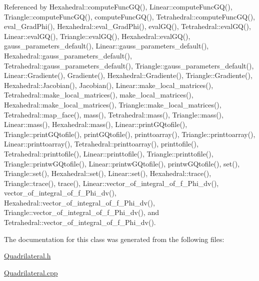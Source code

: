 Referenced by Hexahedral\+::compute\+Func\+G\+Q(), Linear\+::compute\+Func\+G\+Q(), Triangle\+::compute\+Func\+G\+Q(), compute\+Func\+G\+Q(), Tetrahedral\+::compute\+Func\+G\+Q(), eval\+\_\+\+Grad\+Phi(), Hexahedral\+::eval\+\_\+\+Grad\+Phi(), eval\+G\+Q(), Tetrahedral\+::eval\+G\+Q(), Linear\+::eval\+G\+Q(), Triangle\+::eval\+G\+Q(), Hexahedral\+::eval\+G\+Q(), gauss\+\_\+parameters\+\_\+default(), Linear\+::gauss\+\_\+parameters\+\_\+default(), Hexahedral\+::gauss\+\_\+parameters\+\_\+default(), Tetrahedral\+::gauss\+\_\+parameters\+\_\+default(), Triangle\+::gauss\+\_\+parameters\+\_\+default(), Linear\+::\+Gradiente(), Gradiente(), Hexahedral\+::\+Gradiente(), Triangle\+::\+Gradiente(), Hexahedral\+::\+Jacobian(), Jacobian(), Linear\+::make\+\_\+local\+\_\+matrices(), Tetrahedral\+::make\+\_\+local\+\_\+matrices(), make\+\_\+local\+\_\+matrices(), Hexahedral\+::make\+\_\+local\+\_\+matrices(), Triangle\+::make\+\_\+local\+\_\+matrices(), Tetrahedral\+::map\+\_\+face(), mass(), Tetrahedral\+::mass(), Triangle\+::mass(), Linear\+::mass(), Hexahedral\+::mass(), Linear\+::print\+G\+Qtofile(), Triangle\+::print\+G\+Qtofile(), print\+G\+Qtofile(), printtoarray(), Triangle\+::printtoarray(), Linear\+::printtoarray(), Tetrahedral\+::printtoarray(), printtofile(), Tetrahedral\+::printtofile(), Linear\+::printtofile(), Triangle\+::printtofile(), Triangle\+::printw\+G\+Qtofile(), Linear\+::printw\+G\+Qtofile(), printw\+G\+Qtofile(), set(), Triangle\+::set(), Hexahedral\+::set(), Linear\+::set(), Hexahedral\+::trace(), Triangle\+::trace(), trace(), Linear\+::vector\+\_\+of\+\_\+integral\+\_\+of\+\_\+f\+\_\+\+Phi\+\_\+dv(), vector\+\_\+of\+\_\+integral\+\_\+of\+\_\+f\+\_\+\+Phi\+\_\+dv(), Hexahedral\+::vector\+\_\+of\+\_\+integral\+\_\+of\+\_\+f\+\_\+\+Phi\+\_\+dv(), Triangle\+::vector\+\_\+of\+\_\+integral\+\_\+of\+\_\+f\+\_\+\+Phi\+\_\+dv(), and Tetrahedral\+::vector\+\_\+of\+\_\+integral\+\_\+of\+\_\+f\+\_\+\+Phi\+\_\+dv().



The documentation for this class was generated from the following files\+:\begin{DoxyCompactItemize}
\item 
\hyperlink{Quadrilateral_8h}{Quadrilateral.\+h}\item 
\hyperlink{Quadrilateral_8cpp}{Quadrilateral.\+cpp}\end{DoxyCompactItemize}

